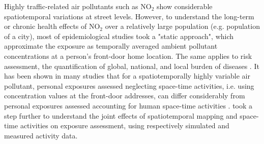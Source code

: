 \documentclass[]{article}
\begin{document}
Highly traffic-related air pollutants such as NO$_2$ show considerable spatiotemporal variations at street levels. However, to understand the long-term or chronic health effects of NO$_2$ over a relatively large population (e.g. population of a city), most of epidemiological studies took a "static approach", which approximate the exposure as temporally averaged ambient pollutant concentrations at a person’s front-door home location. The same applies to risk assessment, the quantification of global, national, and local burden of diseases \citep{achakulwisut2019global}. It has been shown in many studies that for a spatiotemporally highly variable air pollutant, personal exposures assessed neglecting space-time activities, i.e. using concentration values at the front-door addresses, can differ considerably from personal exposures assessed accounting for human space-time activities \citep{duan1997combination,lu2019activity,park2017individual,molter2012performance,zenk2011activity}. \citep{yoo2015geospatial,yoo2021impact} took a step further to understand the joint effects of spatiotemporal mapping and space-time activities on exposure assessment, using respectively simulated and measured activity data. 
\end{document}
